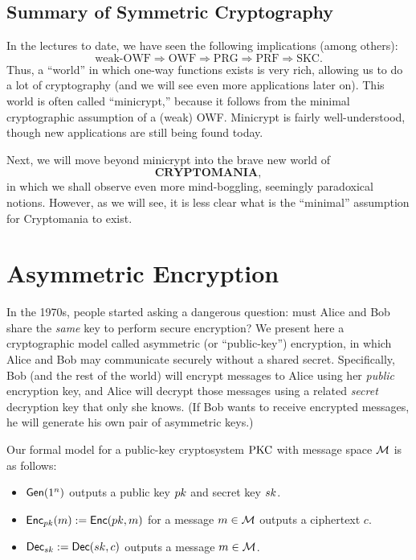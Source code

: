 \documentclass[11pt]{article}
\begin{document}
\subsection{Summary of Symmetric Cryptography}
\label{sec:summ-symm-key}

In the lectures to date, we have seen the following implications
(among others):
\[ \text{weak-OWF} \Rightarrow \text{OWF} \Rightarrow \text{PRG}
\Rightarrow \text{PRF} \Rightarrow \text{SKC}. \] Thus, a ``world'' in
which one-way functions exists is very rich, allowing us to do a lot
of cryptography (and we will see even more applications later on).
This world is often called ``minicrypt,'' because it follows from the
minimal cryptographic assumption of a (weak) OWF.  Minicrypt is fairly
well-understood, though new applications are still being found today.

Next, we will move beyond minicrypt into the brave new world of \[
\textbf{CRYPTOMANIA}, \] in which we shall observe even more
mind-boggling, seemingly paradoxical notions.  However, as we will
see, it is less clear what is the ``minimal'' assumption for
Cryptomania to exist.


\section{Asymmetric Encryption}
\label{sec:asymm-encrypt}

In the 1970s, people started asking a dangerous question: must Alice
and Bob share the \emph{same} key to perform secure encryption?  We
present here a cryptographic model called asymmetric (or
``public-key'') encryption, in which Alice and Bob may communicate
securely without a shared secret.  Specifically, Bob (and the rest of
the world) will encrypt messages to Alice using her \emph{public}
encryption key, and Alice will decrypt those messages using a related
\emph{secret} decryption key that only she knows.  (If Bob wants to
receive encrypted messages, he will generate his own pair of
asymmetric keys.)

Our formal model for a public-key cryptosystem $\text{PKC}$ with message
space $\mathcal{M}$ is as follows:
\begin{itemize}
\item $\mathsf{Gen}(1^{n})$ outputs a public key $pk$ and secret key
  $sk$.
\item $\mathsf{Enc}_{pk}(m) := \mathsf{Enc}(pk, m)$ for a message $m \in
  \mathcal{M}$ outputs a ciphertext $c$.
\item $\mathsf{Dec}_{sk} := \mathsf{Dec}(sk, c)$ outputs a message $m \in
  \mathcal{M}$.
\end{itemize}
\end{document}

